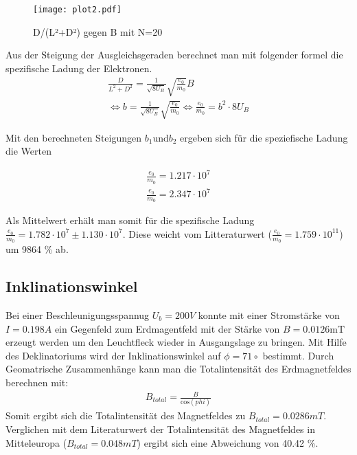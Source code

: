 \FloatBarrier
\begin{figure}
  \centering
  \texttt{[image: plot2.pdf]}
  \caption{D/(L²+D²) gegen B mit N=20}
  \label{fig:plot3}
\end{figure}

Aus der Steigung der Ausgleichsgeraden berechnet man mit folgender formel die spezifische Ladung der Elektronen.
\begin{align*}
  \frac{D}{L^2+D^2} = \frac{1}{\sqrt{8 U_B}} \sqrt{\frac{e_0}{m_0}} B \\
  \Leftrightarrow b = \frac{1}{\sqrt{8 U_B}}\sqrt{\frac{e_0}{m_0}}
  \Leftrightarrow \frac{e_0}{m_0} = b^2 \cdot 8 U_B
\end{align*}

Mit den berechneten Steigungen $b_1 \text{und} b_2$ ergeben sich für die speziefische Ladung die Werten

\begin{align*}
  \frac{e_0}{m_0} = 1.217 \cdot 10^7 \\
  \frac{e_0}{m_0} = 2.347 \cdot 10^7
\end{align*}

Als Mittelwert erhält man somit für die spezifische Ladung $\frac{e_0}{m_0} = 1.782 \cdot 10^7 \pm 1.130 \cdot 10^7 $.
Diese weicht vom Litteraturwert ($\frac{e_0}{m_0} = 1.759 \cdot 10^11$) um 9864 \% ab.

\subsection{Inklinationswinkel}
\label{inklination}

Bei einer Beschleunigungsspannug $U_b = 200V$ konnte mit einer Stromstärke von $I = 0.198 A$ ein Gegenfeld zum Erdmagentfeld mit der Stärke von $B = 0.0126 \text{mT}$ erzeugt werden um den Leuchtfleck wieder in Ausgangslage zu bringen.
Mit Hilfe des Deklinatoriums wird der Inklinationswinkel auf $\phi = 71 \circ$ bestimmt.
Durch Geomatrische Zusammenhänge kann man die Totalintensität des Erdmagnetfeldes berechnen mit:
\begin{align*}
  B_{total} = \frac{B}{\text{cos}(phi)}
\end{align*}
Somit ergibt sich die Totalintensität des Magnetfeldes zu $B_{total} = 0.0286 mT$.
Verglichen mit dem Literaturwert der Totalintensität des Magnetfeldes in Mitteleuropa ($B_{total} = 0.048 mT$) ergibt sich eine Abweichung von 40.42 \%.